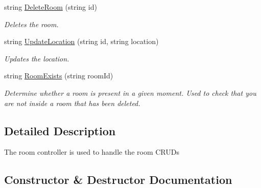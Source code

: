 \begin{DoxyCompactItemize}
string \hyperlink{class_wis_r_rest_a_p_i_1_1_controllers_1_1_room_controller_a089b73167d64c9ee5a4a3181e938d6e9}{Delete\+Room} (string id)
\begin{DoxyCompactList}\small\item\em Deletes the room. \end{DoxyCompactList}\item 
string \hyperlink{class_wis_r_rest_a_p_i_1_1_controllers_1_1_room_controller_accfee91aaadad8e92c68e73aadf184f3}{Update\+Location} (string id, string location)
\begin{DoxyCompactList}\small\item\em Updates the location. \end{DoxyCompactList}\item 
string \hyperlink{class_wis_r_rest_a_p_i_1_1_controllers_1_1_room_controller_a6b6e12d062030d26057ae8e8d55f8e32}{Room\+Exists} (string room\+Id)
\begin{DoxyCompactList}\small\item\em Determine whether a room is present in a given moment. Used to check that you are not inside a room that has been deleted. \end{DoxyCompactList}\end{DoxyCompactItemize}


\subsection{Detailed Description}
The room controller is used to handle the room C\+R\+U\+D\textquotesingle{}s 



\subsection{Constructor \& Destructor Documentation}
\hypertarget{class_wis_r_rest_a_p_i_1_1_controllers_1_1_room_controller_ac8968b0858aec120f53d7b128e80262e}{}

